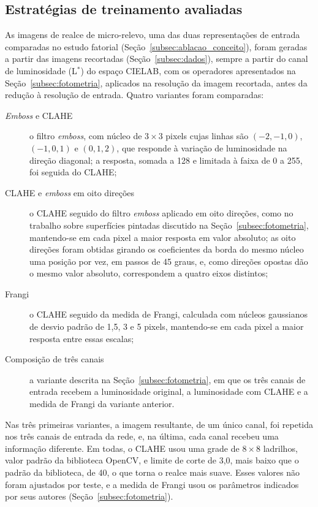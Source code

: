 \documentclass[
    12pt,                %
    openright,           %
    oneside,             %
    a4paper,             %
    english,             %
    brazil               %
]{abntex2}
\begin{document}
\subsection{Estratégias de treinamento avaliadas}
\label{subsec:estrategias}

As imagens de realce de micro-relevo, uma das duas representações de
entrada comparadas no estudo fatorial
(Seção~\ref{subsec:ablacao_conceito}), foram
geradas a partir das imagens recortadas (Seção~\ref{subsec:dados}),
sempre a partir do canal de luminosidade (L$^*$) do espaço CIELAB, com
os operadores apresentados na Seção~\ref{subsec:fotometria}, aplicados
na resolução da imagem recortada, antes da redução à resolução de
entrada. Quatro variantes foram comparadas:

\begin{description}
    \item[\textit{Emboss} e CLAHE] o filtro \textit{emboss}, com núcleo
    de $3 \times 3$ pixels cujas linhas são $(-2, -1, 0)$, $(-1, 0, 1)$
    e $(0, 1, 2)$, que responde à variação de luminosidade na direção
    diagonal; a resposta, somada a 128 e limitada à faixa de 0 a 255,
    foi seguida do CLAHE;
    \item[CLAHE e \textit{emboss} em oito direções] o CLAHE seguido do
    filtro \textit{emboss} aplicado em oito direções, como no trabalho
    sobre superfícies pintadas discutido na
    Seção~\ref{subsec:fotometria}, mantendo-se em cada pixel a maior
    resposta em valor absoluto; as oito direções foram obtidas girando
    os coeficientes da borda do mesmo núcleo uma posição por vez, em
    passos de 45 graus, e, como direções opostas dão o mesmo valor
    absoluto, correspondem a quatro eixos distintos;
    \item[Frangi] o CLAHE seguido da medida de Frangi, calculada com
    núcleos gaussianos de desvio padrão de 1,5, 3 e 5 pixels,
    mantendo-se em cada pixel a maior resposta entre essas escalas;
    \item[Composição de três canais] a variante descrita na
    Seção~\ref{subsec:fotometria}, em que os três canais de entrada
    recebem a luminosidade original, a luminosidade com CLAHE e a medida
    de Frangi da variante anterior.
\end{description}

Nas três primeiras variantes, a imagem resultante, de um único canal,
foi repetida nos três canais de entrada da rede, e, na última, cada canal
recebeu uma informação diferente. Em todas, o CLAHE usou uma grade de
$8 \times 8$ ladrilhos, valor padrão da biblioteca OpenCV, e limite de
corte de 3,0, mais baixo que o padrão da biblioteca, de 40, o que torna
o realce mais suave. Esses valores não foram ajustados por teste, e a
medida de Frangi usou os parâmetros indicados por seus autores
(Seção~\ref{subsec:fotometria}).
\end{document}
